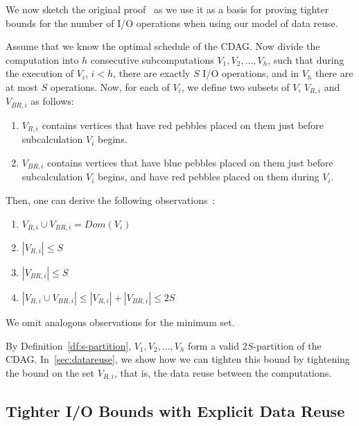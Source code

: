 \documentclass[sigplan,review,anonymous]{acmart}\settopmatter{printfolios=true,printccs=false,printacmref=false}
\begin{document}
We now sketch the original proof~\cite{redblue} as we use it as a basis for 
proving
tighter bounds for the number of I/O operations when using our model of data
reuse.

Assume that we know the optimal schedule of the
CDAG. Now divide the computation into $h$ consecutive subcomputations $V_1,
V_2, ..., V_h$, such that during the execution of $V_i$, $i < h$, there are
exactly $S$ I/O operations, and in $V_h$ there are at most $S$
operations. Now, for each of $V_i$, we
define two subsets of $V$, $V_{R,i}$ and $V_{BR,i}$ as follows:

\begin{enumerate}[leftmargin=1.5em]
\item $V_{R,i}$ contains vertices that have red pebbles placed on them just
before subcalculation $V_i$ begins.
%
\item $V_{BR,i}$ contains vertices that have blue pebbles placed on them just
before subcalculation $V_i$ begins, and have red pebbles placed on them during
$V_i$.
%
\end{enumerate}

\noindent
Then, one can derive the following observations~\cite{redblue}:

\begin{enumerate}
	\item $V_{R,i} \cup V_{BR,i} = Dom(V_i)$
	\item $|V_{R,i}| \le S$
	\item $|V_{BR,i}| \le S$
	\item $|V_{R,i} \cup V_{BR,i}| \le |V_{R,i}| + |V_{BR,i}| \le 2S$
\end{enumerate}
We omit analogous observations for the minimum set. 

By Definition~\ref{df:s-partition}, $V_1,
V_2, ..., V_h$ form %
a valid $2S$-partition of the CDAG.  In~\cref{sec:datareuse}, we show how we
can tighten this bound by tightening the bound on 
the set
$V_{R,i}$, that is, the data reuse between the computations. 

\subsection{Tighter I/O Bounds with Explicit Data Reuse}
\end{document}
